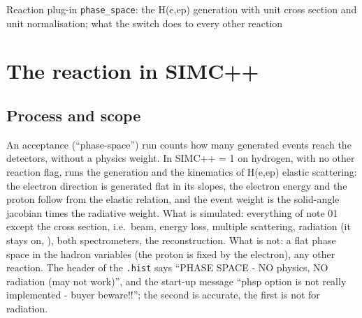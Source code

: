 \documentclass{simcnote}
\begin{document}
%
  {Reaction plug-in \texttt{phase\_space}: the H(e,e\pr p) generation with unit cross section and unit normalisation;
   what the switch does to every other reaction}
\simcnotemaketitle
{}
\simcnotetoc

\section{The reaction in SIMC++}

\subsection{Process and scope}
An acceptance (``phase-space'') run counts how many generated events reach the detectors, without a physics weight. In
SIMC++  = 1 on hydrogen, with no other reaction flag, runs the generation and the kinematics of
H(e,e\pr p) elastic scattering: the electron direction is generated flat in its slopes, the electron energy and the proton
follow from the elastic relation, and the event weight is the solid-angle jacobian times the radiative weight. What is
simulated: everything of note 01 except the cross section, i.e.\ beam, energy loss, multiple scattering, radiation (it
stays on, ), both spectrometers, the reconstruction. What is not: a flat phase space in the hadron
variables (the proton is fixed by the electron), any other reaction. The header of the \texttt{.hist} says
``PHASE SPACE - NO physics, NO radiation (may not work)'', and the start-up message ``phsp option is not really
implemented - buyer beware!!''; the second is accurate, the first is not for radiation.
\end{document}
